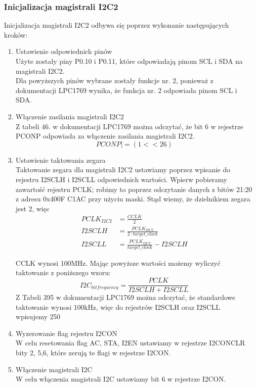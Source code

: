 \subsubsection{Inicjalizacja magistrali I2C2}
Inicjalizacja magistrali I2C2 odbywa się poprzez wykonanie następujących kroków:
\begin{enumerate}
    \item Ustawienie odpowiednich pinów\\
        Użyte zostały piny P0.10 i P0.11, które odpowiadają pinom SCL i SDA na magistrali I2C2.\\
        Dla powyższych pinów wybrane zostały funkcje nr. 2, ponieważ z dokumentacji LPC1769 wynika, że funkcja nr. 2 odpowiada pinom SCL i SDA.\\ %
    \item Włączenie zasilania magistrali I2C2\\
        Z tabeli 46. w dokumentacji LPC1769 można odczytać, że bit 6 w rejestrze PCONP odpowiada za włączenie zasilania magistrali I2C2.
        \[
            PCONP |= (1<<26)
        \]
    \item Ustawienie taktowania zegara\\
        Taktowanie zegara dla magistrali I2C2 ustawiamy poprzez wpisanie do rejestru I2SCLH i I2SCLL odpowiednich wartości. Wpierw pobieramy zawartość rejestru PCLK; robimy to poprzez odczytanie danych z bitów 21:20 z adresu 0x400F C1AC przy użyciu maski. Stąd wiemy, że dzielnikiem zegara jest 2, więc 
        \begin{align*}
        PCLK_{I2C2} &= \frac{CCLK}{2}\\
        I2SCLH &= \frac{PCLK_{I2C2}}{2 \cdot target\_clock}\\
        I2SCLL &= \frac{PCLK_{I2C2}}{target\_clock} - I2SCLH
        \end{align*}
            

        CCLK wynosi 100MHz. Mając powyższe wartości możemy wyliczyć taktowanie z poniższego wzoru:
        \[
        I2C_{bitfrequency} = \frac{PCLK}{I2SCLH + I2SCLL}
        \]
        Z Tabeli 395 w dokumentacji LPC1769 można odczytać, że standardowe taktowanie wynosi 100kHz, więc do rejestrów I2SCLH oraz I2SCLL wpisujemy 250
    \item Wyzerowanie flag rejestru I2CON\\
        W celu resetowania flag AC, STA, I2EN ustawiamy w rejestrze I2CONCLR bity 2, 5,6, które zerują te flagi w rejestrze I2CON.
        
    \item Włączenie magistrali I2C\\
        W celu włączenia magistrali I2C ustawiamy bit 6 w rejestrze I2CON.
\end{enumerate}

